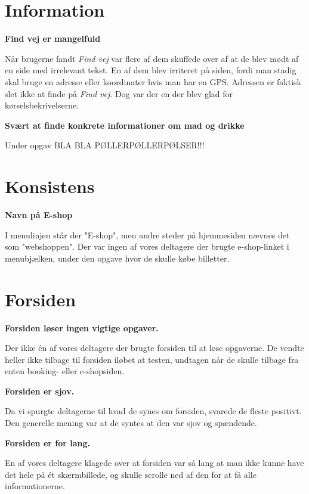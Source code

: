 \documentclass[10pt,a4paper]{article}      %
\newcommand\pic[1]{\texttt{[image: Pics/\#1]}}
\renewcommand\good{\pic{good}}
\renewcommand\smallproblem{\pic{smallproblem}}
\renewcommand\seriousproblem{\pic{seriousproblem}}
\begin{document}
\section{Information}

\begin{kommentarer}

\item[\smallproblem]{\textbf{Find vej er mangelfuld}}

Når brugerne fandt \emph{Find vej} var flere af dem skuffede over af at de blev mødt af en side med irrelevant tekst. En af dem blev irriteret på siden, fordi man stadig skal bruge en adresse eller koordinater hvis man har en GPS. Adressen er faktisk slet ikke at finde på \emph{Find vej}. Dog var der en der blev glad for kørselsbekrivelserne. 

\item[\smallproblem]{\textbf{Svært at finde konkrete informationer om mad og drikke}}

Under opgav  BLA BLA PØLLERPØLLERPØLSER!!!

\end{kommentarer}


\section{Konsistens}

\begin{kommentarer}
\item[\smallproblem]{\textbf{Navn på E-shop}}

I menulinjen står der "E-shop", men andre steder på hjemmesiden nævnes det som "webshoppen". Der var ingen af vores deltagere der brugte e-shop-linket i menubjælken, under den opgave hvor de skulle købe billetter.
\end{kommentarer}

\section{Forsiden}

\begin{kommentarer}
\item[\seriousproblem]{\textbf{Forsiden løser ingen vigtige opgaver.}}

Der ikke én af vores deltagere der brugte forsiden til at løse opgaverne. De vendte heller ikke tilbage til forsiden iløbet at testen, undtagen når de skulle tilbage fra enten booking- eller e-shopsiden.

\item[\good]{\textbf{Forsiden er sjov.}}

Da vi spurgte deltagerne til hvad de synes om forsiden, svarede de fleste positivt. Den generelle mening var at de syntes at den var sjov og spændende.

\item[\smallproblem]{\textbf{Forsiden er for lang.}}

En af vores deltagere klagede over at forsiden var så lang at man ikke kunne have det hele på ét skærmbillede, og skulle scrolle ned af den for at få alle informationerne.
\end{kommentarer}
\end{document}
